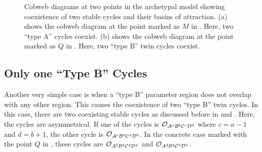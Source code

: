 \begin{figure}
	\centering
	\caption[Cobweb diagrams of the archetypal model showing coexistence of two cycles]{
		Cobweb diagrams at two points in the archetypal model showing coexistence of two stable cycles and their basins of attraction.
		(a) shows the cobweb diagram at the point marked as $M$ in .
		Here, two ``type A'' cycles coexist.
		(b) shows the cobweb diagram at the point marked as $Q$ in .
		Here, two ``type B'' twin cycles coexist.
	}
\end{figure}

\subsection{Only one ``Type B'' Cycles}

Another very simple case is when a ``type B'' parameter region does not overlap with any other region.
This causes the coexistence of two ``type B'' twin cycles.
In this case, there are two coexisting stable cycles as discussed before in  and .
Here, the cycles are asymmetrical.
If one of the cycles is $\mathcal{O}_{\mathcal{A}^a\mathcal{B}^b\mathcal{C}^c\mathcal{D}^d}$ where $c = a - 1$ and $d = b + 1$, the other cycle is $\mathcal{O}_{\mathcal{A}^c\mathcal{B}^d\mathcal{C}^a\mathcal{D}^b}$.
In the concrete case marked with the point $Q$ in , these cycles are $\mathcal{O}_{\mathcal{A}^5\mathcal{B}^3\mathcal{C}^4\mathcal{D}^4}$ and $\mathcal{O}_{\mathcal{A}^4\mathcal{B}^4\mathcal{C}^5\mathcal{D}^3}$.

